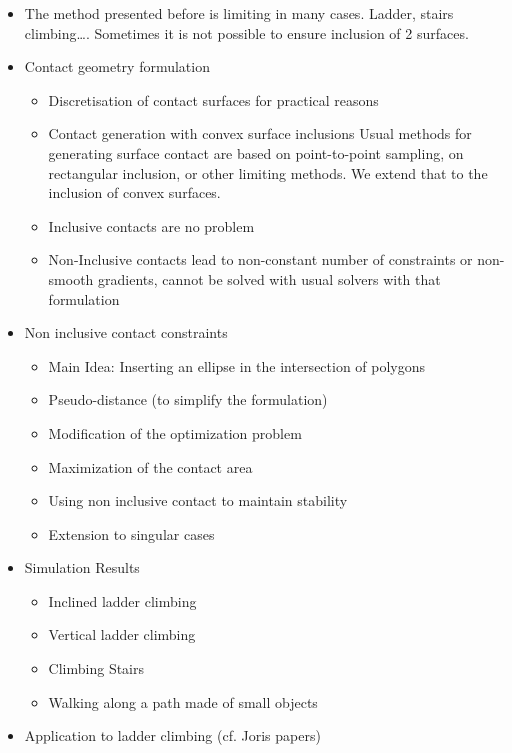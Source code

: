 \begin{itemize}
  \item The method presented before is limiting in many cases. Ladder, stairs climbing\dots.
Sometimes it is not possible to ensure inclusion of 2 surfaces.
  \item Contact geometry formulation
    \begin{itemize}
      \item Discretisation of contact surfaces for practical reasons
      \item Contact generation with convex surface inclusions
Usual methods for generating surface contact are based on point-to-point sampling, on rectangular inclusion, or other limiting methods. We extend that to the inclusion of convex surfaces.
      \item Inclusive contacts are no problem
      \item Non-Inclusive contacts lead to non-constant number of constraints or non-smooth gradients, cannot be solved with usual solvers with that formulation
    \end{itemize}
  \item{Non inclusive contact constraints}
    \begin{itemize}
      \item {Main Idea: Inserting an ellipse in the intersection of polygons}
      \item {Pseudo-distance (to simplify the formulation)}
      \item {Modification of the optimization problem}
      \item {Maximization of the contact area}
      \item {Using non inclusive contact to maintain stability}
      \item {Extension to singular cases}
    \end{itemize}
  \item{Simulation Results}
    \begin{itemize}
      \item{Inclined ladder climbing}
      \item{Vertical ladder climbing}
      \item{Climbing Stairs}
      \item{Walking along a path made of small objects}
    \end{itemize}
  \item{Application to ladder climbing (cf. Joris papers)}
\end{itemize}

